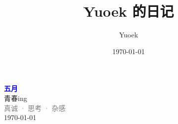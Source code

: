 \documentclass[UTF8, a4paper, 12pt]{ctexart}
\title{\Large Yuoek 的日记}
\author{Yuoek}
\date{\today}
\begin{document}
\thispagestyle{empty}
\maketitle
\clearpage

\tableofcontents
\clearpage

\thispagestyle{empty}
\vspace*{\fill}
\begin{center}
    \textcolor{blue}{\Huge\textbf{五月}} \\[1em]
    \textcolor{blue!60!black}{\Large 青春ing} \\[2em]
    \textcolor{gray}{\large 真诚 · 思考 · 杂感} \\[1em]
    \today
\end{center}
\vspace*{\fill}
\clearpage


\clearpage


\clearpage
\end{document}

